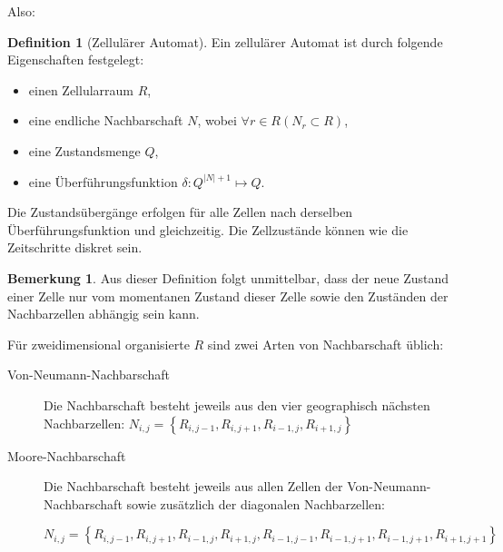 \documentclass[11pt]{scrreprt} %
\theoremstyle{definition}
\newtheorem{definition}{Definition}
\newtheorem*{bemerkung}{Bemerkung}
\begin{document}
Also:

\begin{definition}[Zellulärer Automat] Ein zellulärer Automat ist durch folgende Eigenschaften festgelegt:
\begin{itemize}
\item einen Zellularraum $R$,
\item eine endliche Nachbarschaft $N$, wobei $\forall r \in R \left(N_r \subset R\right)$,
\item eine Zustandsmenge $Q$,
\item eine Überführungsfunktion $\delta: Q^{|N| + 1}\mapsto Q$.
\end{itemize}
Die Zustandsübergänge erfolgen für alle Zellen nach derselben Überführungsfunktion und gleichzeitig. Die Zellzustände können wie die Zeitschritte diskret sein. \cite{wiki:zellautomat}

\end{definition}

\begin{bemerkung}
Aus dieser Definition folgt unmittelbar, dass der neue Zustand einer Zelle nur vom momentanen Zustand dieser Zelle sowie den Zuständen der Nachbarzellen abhängig sein kann.
\end{bemerkung}

Für zweidimensional organisierte $R$ sind zwei Arten von Nachbarschaft üblich:
\begin{description}
\item[Von-Neumann-Nachbarschaft] Die Nachbarschaft besteht jeweils aus den vier geographisch nächsten Nachbarzellen: $N_{i,j} = \left\{ R_{i,j-1}, R_{i,j+1}, R_{i-1,j}, R_{i+1,j}\right\}$
\item[Moore-Nachbarschaft] Die Nachbarschaft besteht jeweils aus allen Zellen der Von-Neumann-Nachbarschaft sowie zusätzlich der diagonalen Nachbarzellen:

$N_{i,j} = \left\{ R_{i,j-1}, R_{i,j+1}, R_{i-1,j}, R_{i+1,j},R_{i-1,j-1}, R_{i-1,j+1}, R_{i-1,j+1}, R_{i+1,j+1} \right\}$ \cite{schurr}
\end{description}
\end{document}
